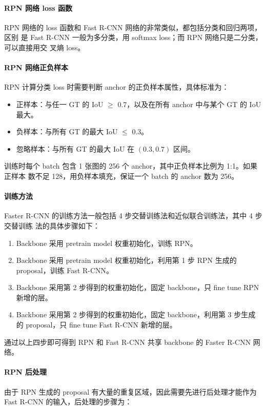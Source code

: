 \paragraph{RPN 网络 loss 函数}
RPN 网络的 loss 函数和 Fast R-CNN 网络的非常类似，都包括分类和回归两项，区别
是 Fast R-CNN 一般为多分类，用 softmax loss；而 RPN 网络只是二分类，可以直接用交
叉熵 loss。

\paragraph{RPN 网络正负样本}
RPN 计算分类 loss 时需要判断 anchor 的正负样本属性，具体标准为：

\begin{itemize}
  \item 正样本：与任一 GT 的 IoU $ \geq $ 0.7，以及在所有 anchor 中与某个 GT 的 IoU
    最大。
  \item 负样本：与所有 GT 的最大 IoU $ \leq $ 0.3。
  \item 忽略样本：与所有 GT 的最大 IoU 在 $(0.3, 0.7)$ 区间。
\end{itemize}

训练时每个 batch 包含 1 张图的 256 个 anchor，其中正负样本比例为 1:1。如果正样本
数不足 128，用负样本填充，保证一个 batch 的 anchor 数为 256。

\paragraph{训练方法}

Faster R-CNN 的训练方法一般包括 4 步交替训练法和近似联合训练法，其中 4 步交替训练
法的具体步骤如下：

\begin{enumerate}
  \item Backbone 采用 pretrain model 权重初始化，训练 RPN。
  \item Backbone 采用 pretrain model 权重初始化，利用第 1 步 RPN 生成的 proposal，训练 Fast R-CNN。
  \item Backbone 采用第 2 步得到的权重初始化，固定 backbone，只 fine tune RPN 新增的层。
  \item Backbone 采用第 2 步得到的权重初始化，固定 backbone，利用第 3 步生成的
    proposal，只 fine tune Fast R-CNN 新增的层。
\end{enumerate}

通过以上四步即可得到 RPN 和 Fast R-CNN 共享 backbone 的 Faster R-CNN 网络。

\paragraph{RPN 后处理}
由于 RPN 生成的 proposal 有大量的重复区域，因此需要先进行后处理才能作为 Fast
R-CNN 的输入，后处理的步骤为：

